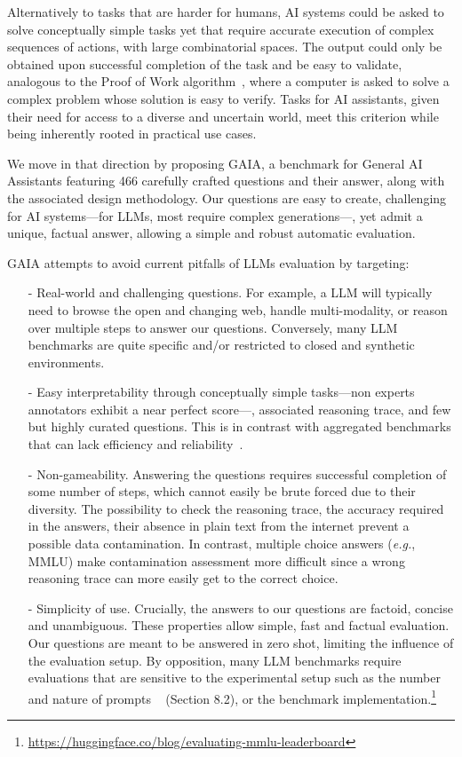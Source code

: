 \documentclass{fairmeta}
\newcommand{\benchmark}{\textsc{GAIA}}
\newcommand{\total}{466}
\begin{document}
Alternatively to tasks that are harder for humans, AI systems could be asked to solve conceptually simple tasks yet that require accurate execution of complex sequences of actions, with large combinatorial spaces. The output could only be obtained upon successful completion of the task and be easy to validate, analogous to the Proof of Work algorithm~\citep{jakobsson1999proofs,dwork1993pricing}, where a computer is asked to solve a complex problem whose solution is easy to verify. Tasks for AI assistants, given their need for access to a diverse and uncertain world, meet this criterion while being inherently rooted in practical use cases.

We move in that direction by proposing \benchmark{}, a benchmark for General AI Assistants featuring \total{} carefully crafted questions and their answer, along with the associated design methodology. Our questions are easy to create, challenging for AI systems---for LLMs, most require complex generations---, yet admit a unique, factual answer, allowing a simple and robust automatic evaluation.

\benchmark{} attempts to avoid current pitfalls of LLMs evaluation by targeting:
\begin{itemize}
    \item[-] Real-world and challenging questions. For example, a LLM will typically need to browse the open and changing web, handle multi-modality, or reason over multiple steps to answer our questions. Conversely, many LLM benchmarks are quite specific and/or restricted to closed and synthetic environments.
    
    \item[-] Easy interpretability through conceptually simple tasks---non experts annotators exhibit a near perfect score---, associated reasoning trace, and few but highly curated questions. This is in contrast with aggregated benchmarks that can lack efficiency and reliability~\citep{perlitz2023efficient}.

    \item[-] Non-gameability. Answering the questions requires successful completion of some number of steps, which cannot easily be brute forced due to their diversity.
    The possibility to check the reasoning trace, the accuracy required in the answers,  their absence in plain text from the internet prevent a possible data contamination. In contrast, multiple choice answers (\textit{e.g.}, MMLU) make contamination assessment more difficult since a wrong reasoning trace can more easily get to the correct choice.
    
    \item[-] Simplicity of use. Crucially, the answers to our questions are factoid, concise and unambiguous. These properties allow simple, fast and factual evaluation. Our questions are meant to be answered in zero shot, limiting the influence of the evaluation setup. By opposition, many LLM benchmarks require evaluations that are sensitive to the experimental setup such as the number and nature of prompts
    ~\citep{liang2022holistic} (Section 8.2), or the benchmark implementation.\footnote{\url{https://huggingface.co/blog/evaluating-mmlu-leaderboard}}
\end{itemize}
\end{document}
